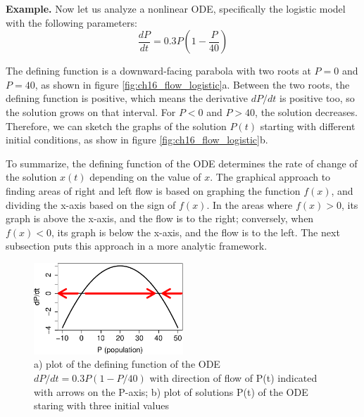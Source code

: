 \documentclass[
  letterpaper,
  DIV=11,
  numbers=noendperiod]{scrreprt}
\begin{document}
\textbf{Example.} Now let us analyze a nonlinear ODE, specifically the
logistic model with the following parameters:
\[\frac{dP}{dt} =0.3P\left(1-\frac{P}{40}\right)\]

The defining function is a downward-facing parabola with two roots at
\(P=0\) and \(P=40\), as shown in figure \ref{fig:ch16_flow_logistic}a.
Between the two roots, the defining function is positive, which means
the derivative \(dP/dt\) is positive too, so the solution grows on that
interval. For \(P<0\) and \(P>40\), the solution decreases. Therefore,
we can sketch the graphs of the solution \(P(t)\) starting with
different initial conditions, as show in figure
\ref{fig:ch16_flow_logistic}b.

To summarize, the defining function of the ODE determines the rate of
change of the solution \(x(t)\) depending on the value of \(x\). The
graphical approach to finding areas of right and left flow is based on
graphing the function \(f(x)\), and dividing the x-axis based on the
sign of \(f(x)\). In the areas where \(f(x) > 0\), its graph is above
the x-axis, and the flow is to the right; conversely, when \(f(x) < 0\),
its graph is below the x-axis, and the flow is to the left. The next
subsection puts this approach in a more analytic framework.

\begin{figure}

{\centering \includegraphics[width=0.5\textwidth,height=\textheight]{./graph_odes_files/figure-pdf/ch7-flow2-1.pdf}

}

\caption{a) plot of the defining function of the ODE
\(dP/dt = 0.3P(1-P/40)\) with direction of flow of P(t) indicated with
arrows on the P-axis; b) plot of solutions P(t) of the ODE staring with
three initial values}

\end{figure}
\end{document}
